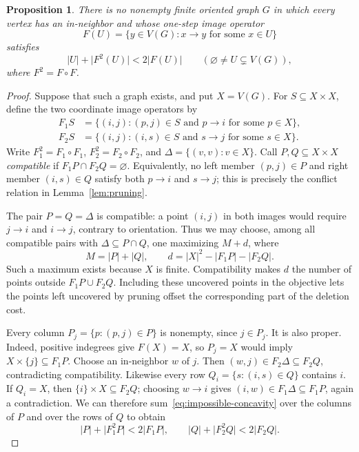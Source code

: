\documentclass[11pt]{article}
\newtheorem{proposition}[theorem]{Proposition}
\theoremstyle{remark}
\newcommand{\abs}[1]{\lvert #1\rvert}
\begin{document}
\begin{proposition}\label{prop:no-concavity}
There is no nonempty finite oriented graph $G$ in which every vertex has an
in-neighbor and whose one-step image operator
\[
 F(U)=\{y\in V(G):x\to y\text{ for some }x\in U\}
\]
satisfies
\begin{equation}\label{eq:impossible-concavity}
 \abs{U}+\abs{F^2(U)}<2\abs{F(U)}
 \qquad(\varnothing\ne U\subsetneq V(G)),
\end{equation}
where $F^2=F\circ F$.
\end{proposition}

\begin{proof}
Suppose that such a graph exists, and put $X=V(G)$.  For $S\subseteq X\times X$,
define the two coordinate image operators by
\[
 \begin{aligned}
 F_1S&=\{(i,j): (p,j)\in S\text{ and }p\to i
                     \text{ for some }p\in X\},\\
 F_2S&=\{(i,j): (i,s)\in S\text{ and }s\to j
                     \text{ for some }s\in X\}.
 \end{aligned}
\]
Write $F_1^2=F_1\circ F_1$, $F_2^2=F_2\circ F_2$, and
$\Delta=\{(v,v):v\in X\}$.  Call $P,Q\subseteq X\times X$ \emph{compatible}
if $F_1P\cap F_2Q=\varnothing$.  Equivalently, no left member $(p,j)\in P$
and right member $(i,s)\in Q$ satisfy both $p\to i$ and $s\to j$; this is
precisely the conflict relation in Lemma~\ref{lem:pruning}.

The pair $P=Q=\Delta$ is compatible: a point $(i,j)$ in both images would
require $j\to i$ and $i\to j$, contrary to orientation.  Thus we may choose,
among all compatible pairs with $\Delta\subseteq P\cap Q$, one maximizing
$M+d$, where
\[
 M=\abs{P}+\abs{Q},\qquad
 d=\abs{X}^2-\abs{F_1P}-\abs{F_2Q}.
\]
Such a maximum exists because $X$ is finite.  Compatibility makes $d$ the
number of points outside $F_1P\cup F_2Q$.  Including these uncovered points
in the objective lets the points left uncovered by pruning offset the
corresponding part of the deletion cost.

Every column $P_j=\{p:(p,j)\in P\}$ is nonempty, since $j\in P_j$.
It is also proper.  Indeed, positive indegrees give $F(X)=X$, so $P_j=X$
would imply $X\times\{j\}\subseteq F_1P$.  Choose an in-neighbor $w$ of
$j$.  Then $(w,j)\in F_2\Delta\subseteq F_2Q$, contradicting compatibility.
Likewise every row $Q_i=\{s:(i,s)\in Q\}$ contains $i$.  If $Q_i=X$,
then $\{i\}\times X\subseteq F_2Q$; choosing $w\to i$ gives
$(i,w)\in F_1\Delta\subseteq F_1P$, again a contradiction.
We can therefore sum~\eqref{eq:impossible-concavity} over the columns of $P$
and over the rows of $Q$ to obtain
\begin{equation}\label{eq:strict-fiber-sums}
 \abs{P}+\abs{F_1^2P}<2\abs{F_1P},\qquad
 \abs{Q}+\abs{F_2^2Q}<2\abs{F_2Q}.
\end{equation}


\end{proof}
\end{document}

